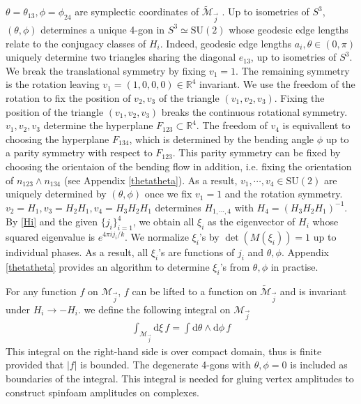 \documentclass[aps,prd,notitlepage,nofootinbib,superscriptaddress,groupedaddress,twocolumn]{revtex4-1}
\def\R{\mathbb{R}}
\newcommand{\Su}{\mathrm{SU}(2)}
\def\be{\begin{eqnarray}}
\def\ee{\end{eqnarray}}
\newcommand{\cm}{\mathcal M}
\newcommand{\rmd}{\mathrm d}
\begin{document}
$\theta=\theta_{13},\phi=\phi_{24}$ are symplectic coordinates of $\widetilde{\cm}_{\vec{j}}$ \cite{Nekrasov:2011bc}. Up to isometries of $S^3$, $(\theta,\phi)$ determines a unique 4-gon in $S^3\simeq \Su$ whose geodesic edge lengths relate to the conjugacy classes of $H_i$. Indeed, geodesic edge lengths $a_i,\theta\in(0,\pi)$ uniquely determine two triangles sharing the diagonal $e_{13}$, up to isometries of $S^3$. We break the translational symmetry by fixing $v_1=1$. The remaining symmetry is the rotation leaving $v_1=(1,0,0,0)\in\R^4$ invariant. We use the freedom of the rotation to fix the position of $v_2,v_3$ of the triangle $(v_1,v_2,v_3)$. Fixing the position of the triangle $(v_1,v_2,v_3)$ breaks the continuous rotational symmetry. $v_1,v_2,v_3$ determine the hyperplane $F_{123}\subset\R^4$. The freedom of $v_4$ is equivallent to choosing the hyperplane $F_{134}$, which is determined by the bending angle $\phi$ up to a parity symmetry with respect to $F_{123}$. This parity symmetry can be fixed by choosing the orientaion of the bending flow in addition, i.e. fixing the orientation of $n_{123}\wedge n_{134}$ (see Appendix \ref{thetatheta}). As a result, $v_1,\cdots,v_{4}\in \Su$ are uniquely determined by $(\theta,\phi)$ once we fix $v_1=1$ and the rotation symmetry. $v_2=H_1,v_3=H_2H_1,v_4=H_3H_2H_1$ determines $H_{1,\cdots,4}$ with $H_4=(H_3H_2H_1)^{-1}$. %
By \eqref{Hi} and the given $\{j_i\}_{i=1}^4$, we obtain all $\xi_i$ as the eigenvector of $H_i$ whose squared eigenvalue is $e^{4\pi ij_i/k}$. We normalize $\xi_i$'s by $\det(M(\xi_i))=1$ up to individual phases. As a result, all $\xi_i$'s are functions of $j_i$ and $\theta,\phi$. Appendix \ref{thetatheta} provides an algorithm to determine $\xi_i$'s from $\theta,\phi$ in practise. 





For any function $f$ on ${\cm}_{\vec{j}}$, $f$ can be lifted to a function on $\widetilde{\cm}_{\vec{j}}$ and is invariant under $H_i\to -H_i$. we define the following integral on ${\cm}_{\vec{j}}$
\be
\int_{{\cm}_{\vec{j}}}\rmd \xi\, f=\int\rmd\theta\wedge\rmd\phi\, f %
\ee
This integral on the right-hand side is over compact domain, thus is finite provided that $|f|$ is bounded. The degenerate 4-gons with $\theta,\phi=0$ is included as boundaries of the integral. This integral is needed for gluing vertex amplitudes to construct spinfoam amplitudes on complexes. 
\end{document}
